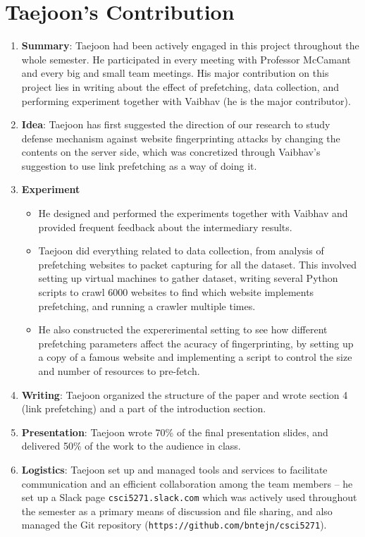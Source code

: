 \documentclass{article}
\begin{document}
\section{Taejoon's Contribution}
\begin{enumerate}
\item
{\bf Summary}:
Taejoon had been actively engaged in this project throughout the whole semester.
He participated in every meeting with Professor McCamant and every big and small team meetings.
His major contribution on this project lies in writing about the effect of prefetching, data collection, and performing experiment together with Vaibhav (he is the major contributor).
\item
{\bf Idea}: Taejoon has first suggested the direction of our research to study defense mechanism against website fingerprinting attacks by changing the contents on the server side, which was concretized through Vaibhav's suggestion to use link prefetching as a way of doing it.
\item
{\bf Experiment}
\begin{itemize}
\item
He designed and performed the experiments together with Vaibhav and provided frequent feedback about the intermediary results.
\item
Taejoon did everything related to data collection, from analysis of prefetching websites to packet capturing for all the dataset.
This involved setting up virtual machines to gather dataset, writing several Python scripts to crawl 6000 websites to find which website implements prefetching, and running a crawler multiple times.
\item
He also constructed the expererimental setting to see how different prefetching parameters affect the acuracy of fingerprinting, by setting up a copy of a famous website and implementing a script to control the size and number of resources to pre-fetch.
\end{itemize}
\item
{\bf Writing}: Taejoon organized the structure of the paper and wrote section 4 (link prefetching) and a part of the introduction section.
\item
{\bf Presentation}: Taejoon wrote 70\% of the final presentation slides, and delivered 50\% of the work to the audience in class.
\item
{\bf Logistics}: Taejoon set up and managed tools and services to facilitate communication and an efficient collaboration among the team members -- he set up a Slack page {\tt csci5271.slack.com} which was actively used throughout the semester as a primary means of discussion and file sharing, and also managed the Git repository ({\tt https://github.com/bntejn/csci5271}).

\end{enumerate}
\end{document}

